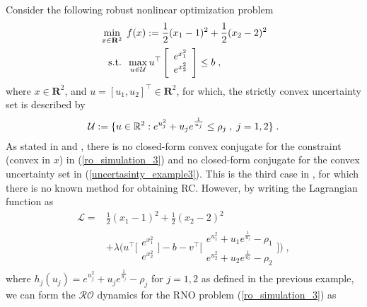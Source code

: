\documentclass[journal,twoside,web]{ieeecolor}
\begin{document}
Consider the following robust nonlinear optimization problem
\begin{align} \label{ro_simulation_3}
&\min_{x \in \mathbf{R}^2} \;f(x):=\frac{1}{2}(x_1-1)^2+\frac{1}{2}(x_2-2)^2\\
&\;\;\;\text{s.t.}\;\;\max_{u\in {\cal U}} u^\top \left[\begin{array}{ccl}e^{x_1^2}\\e^{x_2^2} \end{array}\right] \leq b\;,\;\nonumber
\end{align}
where $x \in \mathbf{R}^2$, and $u=[u_1, u_2]^\top \in \mathbf{R}^2$, for which, the strictly convex uncertainty set is described by
\begin{align} \label{uncertasinty_example3}
{\cal U}:=\{u \in \mathbb{R}^{2}:e^{u_j^2}+u_j e^{\frac{1}{u_j}} \leq \rho_j\;,\; j=1,2\}\;.
\end{align}
As stated in \cite{bental20152} and \cite{gorissen20152}, there is no closed-form convex conjugate for the constraint (convex in $x$) in (\ref{ro_simulation_3}) and no closed-form conjugate for the convex uncertainty set in (\ref{uncertasinty_example3}). This is the third case in \cite[~Table 1]{gorissen20152}, for which there is no known method for obtaining RC. However, by writing the Lagrangian function as
\begin{align*}
\mathcal{L}=&\frac{1}{2}(x_1-1)^2+\frac{1}{2}(x_2-2)^2\\
&+\lambda \Big(u^\top \Big[\begin{array}{ccl}e^{x_1^2}\\e^{x_2^2} \end{array}\Big]-b-v^\top \Big[\begin{array}{cc} e^{u_1^2}+u_1 e^{\frac{1}{u_1}}-\rho_1 \\ e^{u_2^2}+u_2 e^{\frac{1}{u_2}}-\rho_2 \end{array}\Big]\Big)\;,
\end{align*}
where $h_j(u_j)=e^{u_j^2}+u_j e^{\frac{1}{u_j}}-\rho_j$ for $j=1,2$ as defined in the previous example, we can form the $\mathcal{RO}$ dynamics for the RNO problem (\ref{ro_simulation_3}) as
\end{document}

